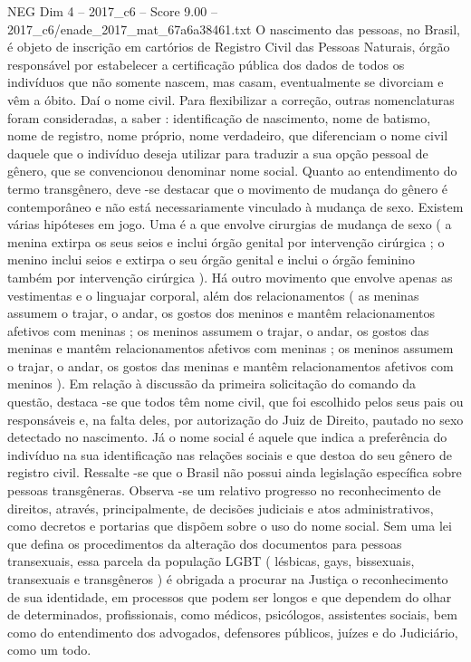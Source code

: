 \begin{textsample}{NEG Dim 4 – 2017\_c6 – Score 9.00 – 2017\_c6/enade\_2017\_mat\_67a6a38461.txt}
O nascimento das pessoas, no Brasil, é objeto de inscrição em cartórios de Registro Civil das Pessoas Naturais, órgão responsável por estabelecer a certificação pública dos dados de todos os indivíduos que não somente nascem, mas casam, eventualmente se divorciam e vêm a óbito.
Daí o nome civil.
Para flexibilizar a correção, outras nomenclaturas foram consideradas, a saber : identificação de nascimento, nome de batismo, nome de registro, nome próprio, nome verdadeiro, que diferenciam o nome civil daquele que o indivíduo deseja utilizar para traduzir a sua opção pessoal de gênero, que se convencionou denominar nome social.
Quanto ao entendimento do termo transgênero, deve -se destacar que o movimento de mudança do gênero é contemporâneo e não está necessariamente vinculado à mudança de sexo.
Existem várias hipóteses em jogo.
Uma é a que envolve cirurgias de mudança de sexo ( a menina extirpa os seus seios e inclui órgão genital por intervenção cirúrgica ; o menino inclui seios e extirpa o seu órgão genital e inclui o órgão feminino também por intervenção cirúrgica ).
Há outro movimento que envolve apenas as vestimentas e o linguajar corporal, além dos relacionamentos ( as meninas assumem o trajar, o andar, os gostos dos meninos e mantêm relacionamentos afetivos com meninas ; os meninos assumem o trajar, o andar, os gostos das meninas e mantêm relacionamentos afetivos com meninas ; os meninos assumem o trajar, o andar, os gostos das meninas e mantêm relacionamentos afetivos com meninos ).
Em relação à discussão da primeira solicitação do comando da questão, destaca -se que todos têm nome civil, que foi escolhido pelos seus pais ou responsáveis e, na falta deles, por autorização do Juiz de Direito, pautado no sexo detectado no nascimento.
Já o nome social é aquele que indica a preferência do indivíduo na sua identificação nas relações sociais e que destoa do seu gênero de registro civil.
Ressalte -se que o Brasil não possui ainda legislação específica sobre pessoas transgêneras.
Observa -se um relativo progresso no reconhecimento de direitos, através, principalmente, de decisões judiciais e atos administrativos, como decretos e portarias que dispõem sobre o uso do nome social.
Sem uma lei que defina os procedimentos da alteração dos documentos para pessoas transexuais, essa parcela da população LGBT ( lésbicas, gays, bissexuais, transexuais e transgêneros ) é obrigada a procurar na Justiça o reconhecimento de sua identidade, em processos que podem ser longos e que dependem do olhar de determinados, profissionais, como médicos, psicólogos, assistentes sociais, bem como do entendimento dos advogados, defensores públicos, juízes e do Judiciário, como um todo.

\end{textsample}
